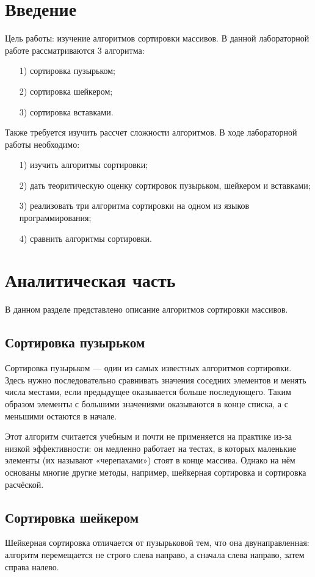 \documentclass[12pt]{report}
\begin{document}
	\chapter*{Введение}
	Цель работы: изучение алгоритмов сортировки массивов. В данной лабораторной работе рассматриваются 3 алгоритма:
	\begin{enumerate}
		\item[1)] сортировка пузырьком;
		\item[2)] сортировка шейкером;
		\item[3)] сортировка вставками. 
	\end{enumerate}
	\noindent Также требуется изучить рассчет сложности алгоритмов. В ходе лабораторной работы необходимо:
	\begin{enumerate}
		\item[1)] изучить алгоритмы сортировки;
		\item[2)] дать теоритическую оценку сортировок пузырьком, шейкером и вставками;
		\item[3)] реализовать три алгоритма сортировки на одном из языков программирования;
		\item[4)] сравнить алгоритмы сортировки.    
	\end{enumerate}

	\chapter{Аналитическая часть}
	В данном разделе представлено описание алгоритмов сортировки массивов.
	\section{Сортировка пузырьком}
	Сортировка пузырьком — один из самых известных алгоритмов сортировки. Здесь нужно последовательно сравнивать значения соседних элементов и менять числа местами, если предыдущее оказывается больше последующего. Таким образом элементы с большими значениями оказываются в конце списка, а с меньшими остаются в начале.
	\par\noindent Этот алгоритм считается учебным и почти не применяется на практике из-за низкой эффективности: он медленно работает на тестах, в которых маленькие элементы (их называют «черепахами») стоят в конце массива. Однако на нём основаны многие другие методы, например, шейкерная сортировка и сортировка расчёской.
	\section{Сортировка шейкером}
	Шейкерная сортировка отличается от пузырьковой тем, что она двунаправленная: алгоритм перемещается не строго слева направо, а сначала слева направо, затем справа налево.
\end{document}
